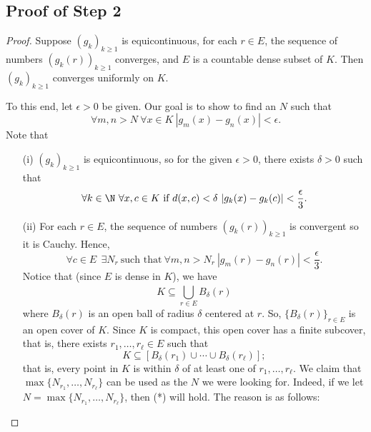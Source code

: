 \subsection*{Proof of Step 2}

\begin{proof}
    Suppose \( ({g}_{k})_{k \geq 1} \) is equicontinuous, for each \( r \in E  \), the sequence of numbers \( ({g}_{k }(r)) _{k \geq 1}\) converges, and \( E  \) is a countable dense subset of \(  K  \). Then \( ({g}_{k})_{k \geq 1} \) converges uniformly on \( K  \).  
    
    To this end, let \( \epsilon > 0 \) be given. Our goal is to show to find an \( N  \) such that 
    \[  \forall m,n > N \ \forall x \in K \ | {g}_{m}(x) - {g}_{n}(x)  | < \epsilon. \tag{*} \]
    Note that 
    \begin{enumerate}
        \item[(i)] \( ({g}_{k})_{k \geq 1} \) is equicontinuous, so for the given \( \epsilon > 0  \), there exists \( \delta > 0  \) such that 
            \[  \forall k \in \N \ \forall x,c \in K \ \text{if} \ d(x,c) < \delta \ | {g}_{k}(x) - {g}_{k }(c)  | < \frac{ \epsilon }{ 3 }. \]
        \item[(ii)] For each \( r \in E  \), the sequence of numbers \( ({g}_{k } (r))_{k \geq 1} \) is convergent so it is Cauchy. Hence, 
            \[  \forall c \in E  \ \ \exists {N}_{r} \ \text{such that} \ \forall m,n > {N}_{r} \ | {g}_{m}(r) - {g}_{n}(r) | < \frac{ \epsilon }{ 3 }. \]
            Notice that (since \( E  \) is dense in \(  K \)), we have
            \[  K \subseteq  \bigcup_{ r \in E  }^{  }  {B}_{\delta}(r) \]
            where \( {B}_{\delta}(r) \) is an open ball of radius \( \delta  \) centered at \( r  \). So, \( \{ {B}_{\delta}(r) \}_{r \in E } \) is an open cover of \( K  \). Since \( K  \) is compact, this open cover has a finite subcover, that is, there exists \( {r}_{1}, \dots, {r}_{\ell} \in E  \) such that  
            \[  K \subseteq  [{B}_{\delta}({r}_{1}) \cup \cdots \cup {B}_{\delta}({r}_{\ell})]; \]
            that is, every point in \( K  \) is within \( \delta  \) of at least one of \( {r}_{1}, \dots, {r}_{\ell} \). We claim that \( \max \{ {N}_{{r}_{1}} , \dots, {N}_{{r}_{\ell}} \}  \) can be used as the \( N  \) we were looking for. Indeed, if we let \( N = \max \{  {N}_{{r}_{1}}, \dots, {N}_{{r}_{\ell}} \}  \), then (*) will hold. The reason is as follows:


\end{enumerate}
\end{proof}
